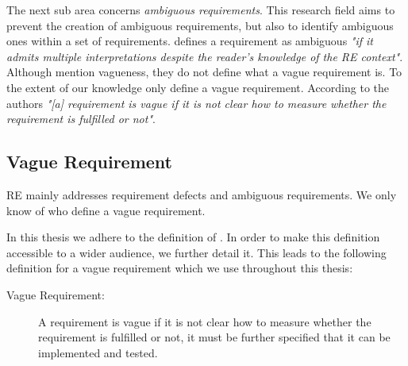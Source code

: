The next sub area concerns \textit{ambiguous requirements}.
This research field aims to prevent the creation of ambiguous requirements, but also to identify ambiguous ones within a set of requirements.
\Textcite{Kamsties:2000} defines a requirement as ambiguous \textit{"if it admits multiple interpretations despite the reader’s knowledge of the RE context"}.
Although \textcite{Kamsties:2000} mention vagueness, they do not define what a vague requirement is.
To the extent of our knowledge only \textcite{Berry:2003} define a vague requirement.
According to the authors \textit{"[a] requirement is vague if it is not clear how to measure whether the requirement is fulfilled or not"}.

\subsection{Vague Requirement}
\label{chp:fundamentals:sec:vagueness:subsec:vague_requirement}
\Ac{RE} mainly addresses requirement defects and ambiguous requirements.
We only know of \textcite{Berry:2003} who define a vague requirement.

In this thesis we adhere to the definition of \textcite{Berry:2003}.
In order to make this definition accessible to a wider audience, we further detail it.
This leads to the following definition for a vague requirement which we use throughout this thesis:
\begin{description}
    \item[Vague Requirement:] A requirement is vague if it is not clear how to measure whether the requirement is fulfilled or not, it must be further specified that it can be implemented and tested.
\end{description}
